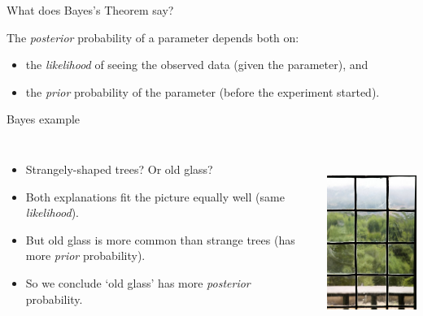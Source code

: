 \documentclass[usenames,dvipsnames]{beamer}
\begin{document}
\begin{frame}{What does Bayes's Theorem say?}
  \begin{block}{}
  The \textit{posterior} probability of a parameter depends both on:
    \begin{itemize}
      \item{the \textit{likelihood} of seeing the observed data (given the parameter), and}
      \item{the \textit{prior} probability of the parameter (before the experiment started).}
    \end{itemize}
  \end{block}
\end{frame}

\begin{frame}{Bayes example}
  \begin{columns}
    \begin{itemize}
      \item{Strangely-shaped trees? Or old glass?}
      \item{Both explanations fit the picture equally well (same \textit{likelihood}).}
      \item{But old glass is more common than strange trees (has more \textit{prior} probability).}
      \item{So we conclude `old glass' has more \textit{posterior} probability.}
    \end{itemize}
    \centering
    \includegraphics[height=6cm]{BDP1F0.jpg}
  \end{columns}
\end{frame}

 
\end{document}
